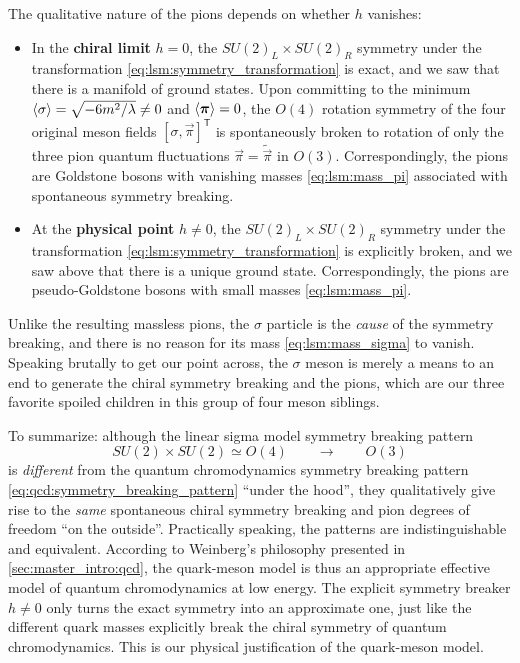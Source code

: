The qualitative nature of the pions depends on whether $h$ vanishes:
\begin{itemize}
\item In the \textbf{chiral limit} $h = 0$,
      the $SU(2)_L \times SU(2)_R$ symmetry under the transformation \eqref{eq:lsm:symmetry_transformation} is exact,
      and we saw that there is a manifold of ground states.
      Upon committing to the minimum $\langle \sigma \rangle = \sqrt{-6m^2/\lambda} \neq 0$ and $\langle {\bm{\pi}} \rangle = 0$,
      the $O(4)$ rotation symmetry of the four original meson fields $[\sigma,\vec\pi]^\mathsf{T}$ is spontaneously broken
      to rotation of only the three pion quantum fluctuations $\vec{\pi} = \tilde{\vec\pi}$ in $O(3)$.
      Correspondingly, the pions are Goldstone bosons with vanishing masses \eqref{eq:lsm:mass_pi} associated with spontaneous symmetry breaking.
\item At the \textbf{physical point} $h \neq 0$,
      the $SU(2)_L \times SU(2)_R$ symmetry under the transformation \eqref{eq:lsm:symmetry_transformation} is explicitly broken,
      and we saw above that there is a unique ground state.
      Correspondingly, the pions are pseudo-Goldstone bosons with small masses \eqref{eq:lsm:mass_pi}.
\end{itemize}
\label{elaborate on mexican hat analogy, brim, tip/tilt, etc.}
Unlike the resulting massless pions, the $\sigma$ particle is the \emph{cause} of the symmetry breaking,
and there is no reason for its mass \eqref{eq:lsm:mass_sigma} to vanish.
Speaking brutally to get our point across, the $\sigma$ meson is merely a means to an end
to generate the chiral symmetry breaking and the pions,
which are our three favorite spoiled children in this group of four meson siblings.

To summarize: although the linear sigma model symmetry breaking pattern
\begin{equation}
	SU(2) \times SU(2) \simeq O(4) \qquad \longrightarrow \qquad O(3)
\end{equation}
is \emph{different} from the quantum chromodynamics symmetry breaking pattern \eqref{eq:qcd:symmetry_breaking_pattern} ``under the hood'',
they qualitatively give rise to the \emph{same} spontaneous chiral symmetry breaking and pion degrees of freedom ``on the outside''.
Practically speaking, the patterns are indistinguishable and equivalent.
According to Weinberg's philosophy presented in \cref{sec:master_intro:qcd},
the quark-meson model is thus an appropriate effective model of quantum chromodynamics at low energy.
The explicit symmetry breaker $h \neq 0$ only turns the exact symmetry into an approximate one,
just like the different quark masses explicitly break the chiral symmetry of quantum chromodynamics.
This is our physical justification of the quark-meson model.

